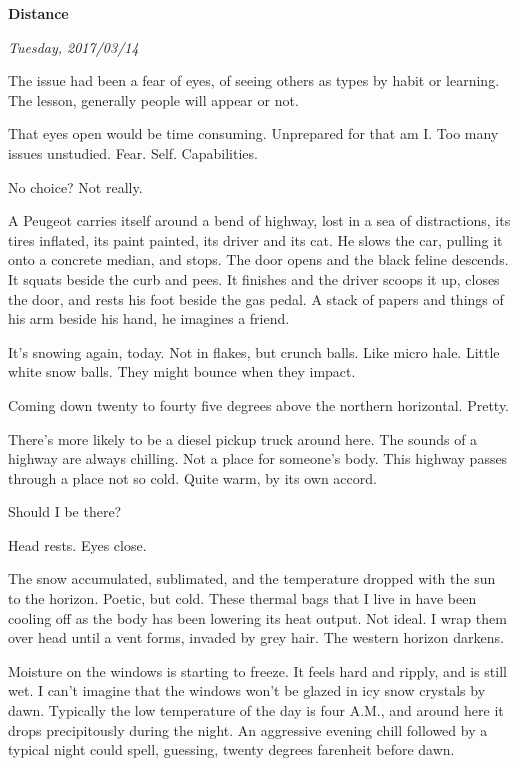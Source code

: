 

\centerline{\bf Distance}
\centerline{\it Tuesday, 2017/03/14}



\break

﻿The issue had been a fear of eyes, of seeing others as types by habit
or learning.  The lesson, generally people will appear or not.

That eyes open would be time consuming.  Unprepared for that am I.
Too many issues unstudied.  Fear.  Self.  Capabilities.

No choice?  Not really.

\break

﻿A Peugeot carries itself around a bend of highway, lost in a sea of
distractions, its tires inflated, its paint painted, its driver and
its cat.  He slows the car, pulling it onto a concrete median, and
stops.  The door opens and the black feline descends.  It squats
beside the curb and pees.  It finishes and the driver scoops it up,
closes the door, and rests his foot beside the gas pedal.  A stack of
papers and things of his arm beside his hand, he imagines a friend.

\break

﻿It's snowing again, today.  Not in flakes, but crunch balls.  Like
micro hale.  Little white snow balls.  They might bounce when they
impact.

Coming down twenty to fourty five degrees above the northern
horizontal.  Pretty.

There's more likely to be a diesel pickup truck around here.  The
sounds of a highway are always chilling.  Not a place for someone's
body.  This highway passes through a place not so cold.  Quite warm,
by its own accord.

\break

﻿Should I be there?

Head rests.  Eyes close.

\break

﻿The snow accumulated, sublimated, and the temperature dropped with the
sun to the horizon.  Poetic, but cold.  These thermal bags that I live
in have been cooling off as the body has been lowering its heat
output.  Not ideal.  I wrap them over head until a vent forms, invaded
by grey hair.  The western horizon darkens.

\break

﻿Moisture on the windows is starting to freeze.  It feels hard and
ripply, and is still wet.  I can't imagine that the windows won't be
glazed in icy snow crystals by dawn.  Typically the low temperature of
the day is four A.M., and around here it drops precipitously during
the night.  An aggressive evening chill followed by a typical night
could spell, guessing, twenty degrees farenheit before dawn.


